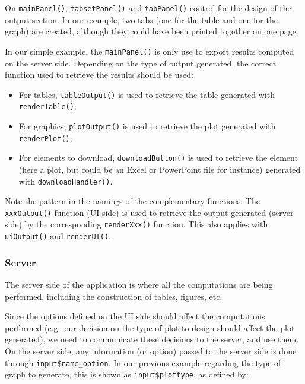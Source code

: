 \documentclass[
]{krantz}
\providecommand{\tightlist}{%
  \setlength{\itemsep}{0pt}\setlength{\parskip}{0pt}}
\renewenvironment{quote}{\begin{VF}}{\end{VF}}
\begin{document}
On \texttt{mainPanel()}, \texttt{tabsetPanel()} and \texttt{tabPanel()} control for the design of the output section. In our example, two tabs (one for the table and one for the graph) are created, although they could have been printed together on one page.

In our simple example, the \texttt{mainPanel()} is only use to export results computed on the server side. Depending on the type of output generated, the correct function used to retrieve the results should be used:

\begin{itemize}
\tightlist
\item
  For tables, \texttt{tableOutput()} is used to retrieve the table generated with \texttt{renderTable()};
\item
  For graphics, \texttt{plotOutput()} is used to retrieve the plot generated with \texttt{renderPlot()};
\item
  For elements to download, \texttt{downloadButton()} is used to retrieve the element (here a plot, but could be an Excel or PowerPoint file for instance) generated with \texttt{downloadHandler()}.
\end{itemize}

\begin{quote}
Note the pattern in the namings of the complementary functions: The \texttt{xxxOutput()} function (UI side) is used to retrieve the output generated (server side) by the corresponding \texttt{renderXxx()} function. This also applies with \texttt{uiOutput()} and \texttt{renderUI()}.
\end{quote}

\hypertarget{server}{%
\subsubsection{Server}\label{server}}

The server side of the application is where all the computations are being performed, including the construction of tables, figures, etc.

Since the options defined on the UI side should affect the computations performed (e.g.~our decision on the type of plot to design should affect the plot generated), we need to communicate these decisions to the server, and use them.
On the server side, any information (or option) passed to the server side is done through \texttt{input\$name\_option}. In our previous example regarding the type of graph to generate, this is shown as \texttt{input\$plottype}, as defined by:
\end{document}
